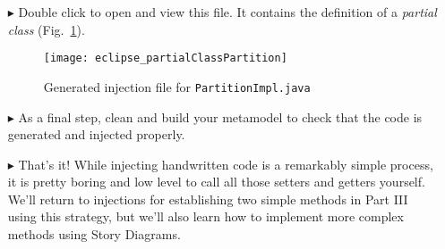 \begin{itemize}
\item[$\blacktriangleright$] Double click to open and view this file. It contains the definition of a \textit{partial class}
(Fig.~\ref{fig:injection_partialClassPartition}).

\begin{figure}[htbp]
    \centering
    \texttt{[image: eclipse\_partialClassPartition]}
    \caption{Generated injection file for \texttt{PartitionImpl.java}}
    \label{fig:injection_partialClassPartition}
\end{figure}

\clearpage

\item[$\blacktriangleright$] As a final step, clean and build your metamodel to check that the code is generated and injected properly.

\item[$\blacktriangleright$] That's it! While injecting handwritten code is a remarkably simple process, it is pretty boring and low level to call all those
setters and getters yourself. We'll return to injections for establishing two simple methods in Part III using this strategy, but we'll also learn how to
implement more complex methods using Story Diagrams.
 
\end{itemize}
